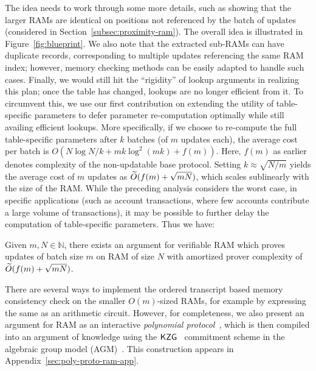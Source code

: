The idea needs to work through some more details, such as showing that the larger RAMs are identical
on positions not referenced by the batch of updates (considered in Section~\ref{subsec:proximity-ram}).
The overall idea is illustrated in Figure~\ref{fig:blueprint}. We also note that the extracted sub-RAMs can
have duplicate records, corresponding to multiple updates referencing the same RAM index; however, memory
checking methods can be easily adapted to handle such cases. Finally, we would still hit the ``rigidity'' of lookup arguments
in realizing this plan; once the table has changed, lookups are no longer efficient from it. To circumvent this,
we use our first contribution on extending the utility of table-specific parameters to defer parameter
re-computation optimally while still availing efficient lookups. More specifically, if we choose to
re-compute the full table-specific parameters after $k$ batches (of $m$ updates each),
the average cost per batch is $O(N\log N/k + mk\log^2(mk) + f(m))$. Here, $f(m)$ as earlier denotes complexity
of the non-updatable base protocol. Setting $k\approx \sqrt{N/m}$ yields the average cost of $m$ updates as $\widetilde{O}(f(m)+\sqrt{mN})$,
which scales sublinearly with the size of the RAM.
While the preceding analysis considers the worst case,
in specific applications (such as account transactions, where few accounts contribute a large volume of transactions), it may be
possible to further delay the computation of table-specific parameters.
Thus we have:
\begin{theorem}[Informal]\label{thm:inc-ver-ram-informal}
	Given $m,N\in \mathbb{N}$, there exists an argument for verifiable RAM which proves updates of batch size $m$ on RAM of size $N$
	with amortized prover complexity of $\widetilde{O}(f(m) + \sqrt{mN})$.
\end{theorem}


 There are several ways to implement the ordered transcript based
memory consistency check on the smaller $O(m)$-sized RAMs, for example by expressing the same as an arithmetic
circuit. However, for completeness, we also present an argument for RAM as an
interactive {\em polynomial protocol}~\cite{Gabizon2019PLONKPO}, which is then compiled into an argument of knowledge using the $\mathsf{KZG}$~\cite{AC:KatZavGol10}
commitment scheme in the algebraic group model (AGM)~\cite{C:FucKilLos18}. This construction appears in
Appendix~\ref{sec:poly-proto-ram-app}.


